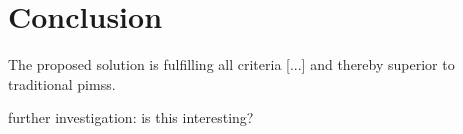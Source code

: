 \section{Conclusion}

The proposed solution is fulfilling all criteria [...] and thereby superior to
traditional \glspl{pims}.

further investigation: is this interesting?
